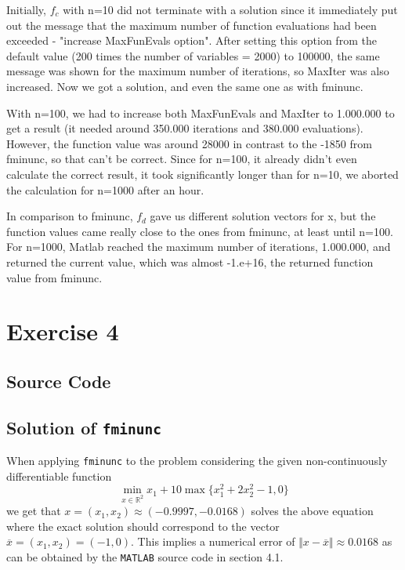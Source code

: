 \documentclass{article}
\begin{document}
    Initially, $f_c$ with n=10 did not terminate with a solution since it immediately put out the message that the maximum number of function evaluations had been exceeded - "increase MaxFunEvals option". After setting this option from the default value (200 times the number of variables = 2000) to 100000, the same message was shown for the maximum number of iterations, so MaxIter was also increased. Now we got a solution, and even the same one as with fminunc.

    With n=100, we had to increase both MaxFunEvals and MaxIter to 1.000.000 to get a result (it needed around 350.000 iterations and 380.000 evaluations). However, the function value was around 28000 in contrast to the -1850 from fminunc, so that can't be correct. Since for n=100, it already didn't even calculate the correct result, it took significantly longer than for n=10, we aborted the calculation for n=1000 after an hour.

    In comparison to fminunc, $f_d$ gave us different solution vectors for x, but the function values came really close to the ones from fminunc, at least until n=100. For n=1000, Matlab reached the maximum number of iterations, 1.000.000, and returned the current value, which was almost -1.e+16, the returned function value from fminunc.
	
	\section{Exercise 4}
	\subsection{Source Code}
	
	
	\subsection{Solution of \texttt{fminunc}}
	When applying \texttt{fminunc} to the problem considering the given non-continuously differentiable function 
	\begin{equation*}
		\min_{x\in\mathbb{R}^2}x_1+10\max\{x_1^2+2x_2^2-1,0\}
	\end{equation*}
	we get that $x=(x_1,x_2)\approx(-0.9997,-0.0168)$ solves the above equation where the exact solution should correspond to the vector $\overline{x}=(x_1,x_2)=(-1,0)$. This implies a numerical error of $\Vert x - \overline{x}\Vert \approx 0.0168$ as can be obtained by the \texttt{MATLAB} source code in section 4.1.
\end{document}
